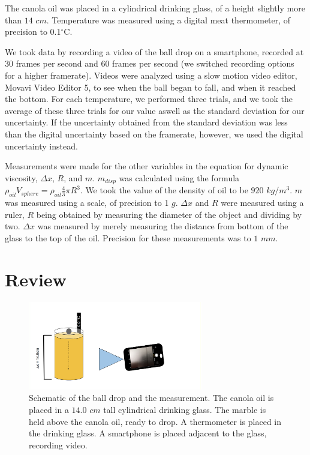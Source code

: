 \documentclass[aps,twocolumn,showpacs,preprintnumbers]{revtex4}
\begin{document}
The canola oil was placed in a cylindrical drinking glass, of a height slightly more than $14$  $cm$. Temperature was measured using a digital meat thermometer, of precision to 0.1$^{\circ}$C.

We took data by recording a video of the ball drop on a smartphone, recorded at 30 frames per second and 60 frames per second (we switched recording options for a higher framerate). Videos were analyzed using a slow motion video editor, Movavi Video Editor 5, to see when the ball began to fall, and when it reached the bottom. For each temperature, we performed three trials, and we took the average of these three trials for our value aswell as the standard deviation for our uncertainty. If the uncertainty obtained from the standard deviation was less than the digital uncertainty based on the framerate, however, we used the digital uncertainty instead.

Measurements were made for the other variables in the equation for dynamic viscosity, $\Delta x$, $R$, and $m$. $m_{disp}$ was calculated using the formula $\rho _{oil}V_{sphere} = \rho _{oil}\frac{4}{3}\pi R^3$. We took the value of the density of oil to be $920 $ $kg/m^3$\cite{canola_oil_density}. $m$ was measured using a scale, of precision to 1 $g$. $\Delta x$ and $R$ were measured using a ruler, $R$ being obtained by measuring the diameter of the object and dividing by two. $\Delta x$ was measured by merely measuring the distance from bottom of the glass to the top of the oil. Precision for these measurements was to $1$ $mm$.
 



\section{Review}



\begin{figure}
%
\includegraphics[width=3.0in]{schematic.png}
%
\caption{\label{setup} 
Schematic of the ball drop and the measurement.
The canola oil is placed in a $14.0$ $cm$ tall cylindrical drinking glass. The marble is held above the canola oil, ready to drop. A thermometer is placed in the drinking glass.
A smartphone is placed adjacent to the glass, recording video.}
%
\end{figure}
\end{document}

